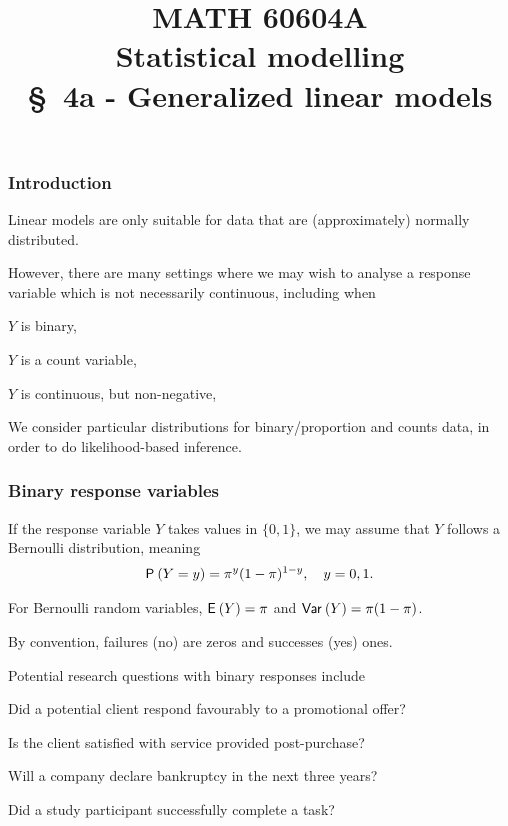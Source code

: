 \documentclass{beamer}
\title[\color{white}{MATH 60604A \S~4a - Generalized linear models}]{\texorpdfstring{MATH 60604A \\Statistical modelling \\ \S~4a - Generalized linear models}{MATH 60604A \\Statistical modelling \\ \S~4a - Generalized linear models}}
\author{}
\institute{HEC Montréal\\
Department of Decision Sciences}
\date{}
\begin{document}
\frame{\titlepage}
\begin{frame}
\frametitle{Introduction}
\bi
\item Linear models are only suitable for data that are (approximately) normally distributed. 
\item However, there are many settings where we may wish to analyse a response variable which is not necessarily continuous, including when
\bi
\item $Y$ is \alert{binary}, 
\item $Y$ is a \alert{count} variable, 
\item $Y$ is \alert{continuous, but non-negative}, 
\ei
\item We consider particular distributions for binary/proportion and counts data, in order to do likelihood-based inference.
\ei
\end{frame}


\begin{frame}
\frametitle{Binary response variables}
\bi
\item If the response variable $Y$ takes values in $\{0, 1\}$, we may assume that $Y$ follows a \alert{Bernoulli} distribution, meaning
\begin{align*}
\P{Y=y} = \pi^y (1-\pi)^{1-y}, \quad y=0, 1.
\end{align*}
\item For Bernoulli random variables, $\E{Y}=\pi$ and $\Va{Y}=\pi(1-\pi)$.
\item By convention, failures (no) are zeros and  successes (yes) ones.
\item Potential research questions with binary responses include
\bi
\item Did a potential client respond favourably to a promotional offer?
\item Is the client satisfied with service provided post-purchase?
\item Will a company declare bankruptcy in the next three years?
\item Did a study participant successfully complete a task?
\ei
\ei
\end{frame}
\end{document}
